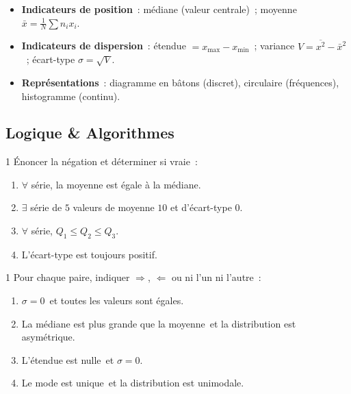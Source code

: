 \begin{bilan}
\begin{itemize}
  \item \textbf{Indicateurs de position}~:
        m\'ediane (valeur centrale)~;
        moyenne $\bar{x}=\frac{1}{N}\sum n_i x_i$.
  \item \textbf{Indicateurs de dispersion}~:
        \'etendue $= x_{\max}-x_{\min}$~;
        variance $V=\overline{x^2}-\bar{x}^2$~;
        \'ecart-type $\sigma=\sqrt{V}$.
  \item \textbf{Repr\'esentations}~: diagramme en b\^atons (discret),
        circulaire (fr\'equences), histogramme (continu).
\end{itemize}
\end{bilan}

\subsection*{Logique \& Algorithmes}

\begin{exo}{1}
\'Enoncer la n\'egation et d\'eterminer si vraie~:
\begin{enumerate}
  \item $\forall$ s\'erie, la moyenne est \'egale \`a la m\'ediane.
  \item $\exists$ s\'erie de $5$ valeurs de moyenne $10$ et d'\'ecart-type $0$.
  \item $\forall$ s\'erie, $Q_1\leq Q_2\leq Q_3$.
  \item L'\'ecart-type est toujours positif.
\end{enumerate}
\end{exo}

\begin{exo}{1}
Pour chaque paire, indiquer $\Rightarrow$, $\Leftarrow$ ou ni l'un ni l'autre~:
\begin{enumerate}
  \item \og $\sigma=0$\fg\ et \og toutes les valeurs sont \'egales\fg.
  \item \og La m\'ediane est plus grande que la moyenne\fg\ et
        \og la distribution est asym\'etrique\fg.
  \item \og L'\'etendue est nulle\fg\ et \og $\sigma=0$\fg.
  \item \og Le mode est unique\fg\ et \og la distribution est unimodale\fg.
\end{enumerate}
\end{exo}

